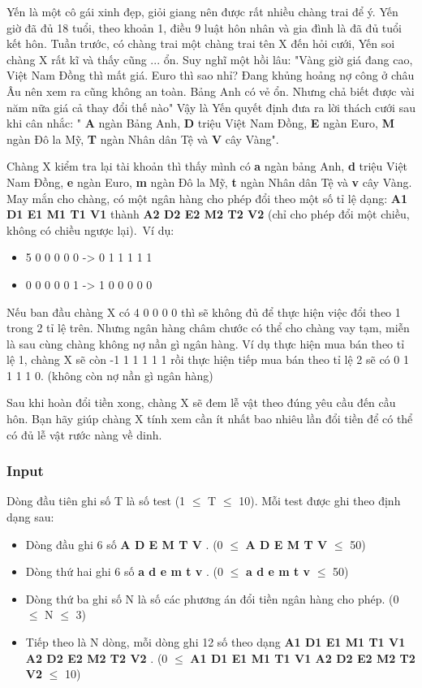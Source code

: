 

Yến là một cô gái xinh đẹp, giỏi giang nên được rất nhiều chàng trai để ý. Yến giờ đã đủ 18 tuổi, theo khoản 1, điều 9 luật hôn nhân và gia đình là đã đủ tuổi kết hôn. Tuần trước, có chàng trai một chàng trai tên X đến hỏi cưới, Yến soi chàng X rất kĩ và thấy cũng ... ổn. Suy nghĩ một hồi lâu: "Vàng giờ giá đang cao, Việt Nam Đồng thì mất giá. Euro thì sao nhỉ? Đang khủng hoảng nợ công ở châu Âu nên xem ra cũng không an toàn. Bảng Anh có vẻ ổn. Nhưng chả biết được vài năm nữa giá cả thay đổi thế nào" Vậy là Yến quyết định đưa ra lời thách cưới sau khi cân nhắc: " \textbf{ A } ngàn Bảng Anh, \textbf{ D } triệu Việt Nam Đồng, \textbf{ E } ngàn Euro, \textbf{ M } ngàn Đô la Mỹ, \textbf{ T } ngàn Nhân dân Tệ và \textbf{ V } cây Vàng".

Chàng X kiểm tra lại tài khoản thì thấy mình có \textbf{ a } ngàn bảng Anh, \textbf{ d } triệu Việt Nam Đồng, \textbf{ e } ngàn Euro, \textbf{ m } ngàn Đô la Mỹ, \textbf{ t } ngàn Nhân dân Tệ và \textbf{ v } cây Vàng. May mắn cho chàng, có một ngân hàng cho phép đổi theo một số tỉ lệ dạng: \textbf{ A1 D1 E1 M1 T1 V1 } thành \textbf{ A2 D2 E2 M2 T2 V2 } (chỉ cho phép đổi một chiều, không có chiều ngược lại). Ví dụ:
\begin{itemize}
	\item 5 0 0 0 0 0 -> 0 1 1 1 1 1
	\item 0 0 0 0 0 1 -> 1 0 0 0 0 0
\end{itemize}

Nếu ban đầu chàng X có 4 0 0 0 0 thì sẽ không đủ để thực hiện việc đổi theo 1 trong 2 tỉ lệ trên. Nhưng ngân hàng châm chước có thể cho chàng vay tạm, miễn là sau cùng chàng không nợ nần gì ngân hàng. Ví dụ thực hiện mua bán theo tỉ lệ 1, chàng X sẽ còn -1 1 1 1 1 1 rồi thực hiện tiếp mua bán theo tỉ lệ 2 sẽ có 0 1 1 1 1 0. (không còn nợ nần gì ngân hàng)

Sau khi hoàn đổi tiền xong, chàng X sẽ đem lễ vật theo đúng yêu cầu đến cầu hôn. Bạn hãy giúp chàng X tính xem cần ít nhất bao nhiêu lần đổi tiền để có thể có đủ lễ vật rước nàng về dinh.

\subsubsection{Input}

Dòng đầu tiên ghi số T là số test (1  $\le$  T  $\le$  10). Mỗi test được ghi theo định dạng sau:
\begin{itemize}
	\item Dòng đầu ghi 6 số \textbf{ A D E M T V } . (0  $\le$  \textbf{ A D E M T V }  $\le$  50)
	\item Dòng thứ hai ghi 6 số \textbf{ a d e m t v } . (0  $\le$  \textbf{ a d e m t v }  $\le$  50)
	\item Dòng thứ ba ghi số N là số các phương án đổi tiền ngân hàng cho phép. (0  $\le$  N  $\le$  3)
	\item Tiếp theo là N dòng, mỗi dòng ghi 12 số theo dạng \textbf{ A1 D1 E1 M1 T1 V1 A2 D2 E2 M2 T2 V2 } . (0  $\le$  \textbf{ A1 D1 E1 M1 T1 V1 A2 D2 E2 M2 T2 V2 }  $\le$  10)
\end{itemize}

